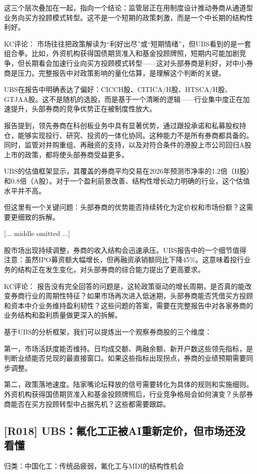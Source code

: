 \documentclass[11pt]{ctexart}
\begin{document}
这三个层次叠加在一起，指向一个结论：监管层正在用制度设计推动券商从通道型业务向买方投顾模式转型。这不是一个短期的政策刺激，而是一个中长期的结构性利好。

KC评论： 市场往往把政策解读为“利好出尽”或“短期情绪”，但UBS看到的是一套组合拳。比如，外资机构获得国债期货准入和基金投顾牌照，短期内可能加剧竞争，但长期看会加速行业向买方投顾模式转型——这对头部券商是利好，对中小券商是压力。完整报告中对政策影响的量化估算，是理解这个判断的关键。

UBS在报告中明确表达了偏好：CICCH股、CITICA/H股、HTSCA/H股、GTJAA股。这不是随机的选股，而是基于一个清晰的逻辑——行业集中度正在加速提升，头部券商的竞争优势正在被制度性放大。

报告提到，领先券商在科创板业务中具有显著优势，通过跟投承诺和私募股权持仓，能够实现投行、研究、投资的一体化协同。这种能力不是所有券商都具备的。同时，监管对并购重组、再融资的支持，以及对符合条件的港股上市公司回归A股上市的政策，都将使头部券商受益更多。

UBS的估值框架显示，其覆盖的券商平均交易在2026年预测市净率的1.2倍（H股）和0.8倍（A股）。对于一个盈利前景改善、结构性增长动力明确的行业，这个估值水平并不高。

但这里有一个关键问题：头部券商的优势能否持续转化为定价权和市场份额？这需要更细致的拆解。


[... middle omitted ...]

股市场出现持续调整，券商的收入结构会迅速承压。UBS报告中的一个细节值得注意：虽然IPO募资额大幅增长，但再融资承销额同比下降45\%。这意味着投行业务的结构正在发生变化，对头部券商的综合能力提出了更高要求。

KC评论： 报告没有完全回答的问题是，这轮政策驱动的增长周期，是否真的能改变券商行业的周期性特征？如果市场再次进入低迷期，头部券商能否凭借买方投顾和资本中介业务维持盈利韧性？这些问题的答案，需要在完整报告中对各家券商的业务结构和盈利质量做更深入的拆解。

基于UBS的分析框架，我们可以提炼出一个观察券商股的三个维度：

第一，市场活跃度能否维持。日均成交额、两融余额、新开户数这些领先指标，是判断业绩能否兑现的最直接窗口。如果这些指标出现拐点，券商的业绩预期需要同步调整。

第二，政策落地速度。陆家嘴论坛释放的信号需要转化为具体的规则和实施细则。外资机构获得国债期货准入和基金投顾牌照后，行业竞争格局会如何演变？头部券商能否在买方投顾转型中占据先机？这些都需要跟踪。

\subsection{[R018] UBS：氟化工正被AI重新定价，但市场还没看懂}
{\small\color{refgray}归类：中国化工：传统品疲弱，氟化工与MDI的结构性机会}
\end{document}
